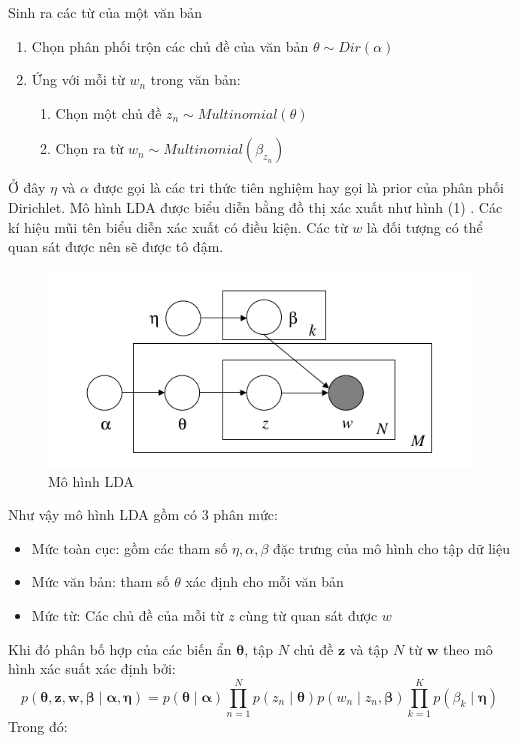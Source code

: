 \documentclass[fontsize=13pt]{scrartcl}
\begin{document}
Sinh ra các từ của một văn bản
\begin{enumerate}
\item Chọn phân phối trộn các chủ đề của văn bản $\theta \sim Dir(\alpha)$
\item  Ứng với mỗi từ $w_n$ trong văn bản:
\begin{enumerate}
\item Chọn một chủ đề $z_n \sim Multinomial(\theta)$
\item Chọn ra từ $w_n \sim Multinomial(\beta_{z_{n}})$
\end{enumerate}
\end{enumerate}
Ở đây $\eta$ và $\alpha$ được gọi là các tri thức tiên nghiệm hay gọi là prior của phân phối Dirichlet. Mô hình LDA được biểu diễn bằng đồ thị xác xuất như hình (1) . Các kí hiệu mũi tên biểu diễn xác xuất có điều kiện. Các từ $w$ là đối tượng có thể quan sát được nên sẽ được tô đậm.
\begin{figure}[h]
\label{fig:ldaFull}
\begin{center}
\includegraphics[scale=0.5]{img/lda_full.png}
\end{center}
\caption{Mô hình LDA}
\end{figure}
Như vậy mô hình LDA gồm có 3 phân mức: 
\begin{itemize}
\item Mức toàn cục: gồm các tham số $\eta, \alpha, \beta$ đặc trưng của mô hình cho tập dữ liệu
\item Mức văn bản: tham số $\theta$ xác định cho mỗi văn bản
\item Mức từ: Các chủ đề của mỗi từ $z$ cùng từ quan sát được $w$
\end{itemize}
Khi đó phân bố hợp của các biến ẩn $\boldsymbol\theta$, tập $N$ chủ đề $\mathbf{z}$ và tập $N$ từ $\mathbf{w}$ theo mô hình xác suất xác định bởi:\\

\begin{equation}
p(\boldsymbol{\theta},\mathbf{z},\mathbf{w},\boldsymbol\beta \mid \boldsymbol\alpha,\boldsymbol\eta) = p(\boldsymbol{\theta}\mid \boldsymbol\alpha )\prod_{n=1}^{N}p(z_n \mid \boldsymbol{\theta})p(w_n \mid z_n,\boldsymbol\beta)\prod_{k=1}^{K}p(\beta_k\mid \boldsymbol\eta)
\end{equation}
Trong đó:
\end{document}
